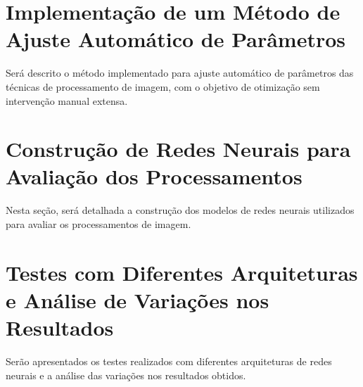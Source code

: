 \section{Implementação de um Método de Ajuste Automático de Parâmetros}
Será descrito o método implementado para ajuste automático de parâmetros das técnicas de processamento de imagem, com o objetivo de otimização sem intervenção manual extensa.

\section{Construção de Redes Neurais para Avaliação dos Processamentos}
Nesta seção, será detalhada a construção dos modelos de redes neurais utilizados para avaliar os processamentos de imagem.

\section{Testes com Diferentes Arquiteturas e Análise de Variações nos Resultados}
Serão apresentados os testes realizados com diferentes arquiteturas de redes neurais e a análise das variações nos resultados obtidos.
